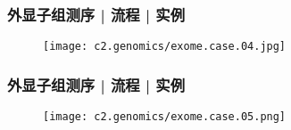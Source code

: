 \begin{frame}
  \frametitle{外显子组测序 | 流程 | 实例}
  \begin{figure}
    \centering
    \texttt{[image: c2.genomics/exome.case.04.jpg]}
  \end{figure}
\end{frame}

\begin{frame}
  \frametitle{外显子组测序 | 流程 | 实例}
  \begin{figure}
    \centering
    \texttt{[image: c2.genomics/exome.case.05.png]}
  \end{figure}
\end{frame}


